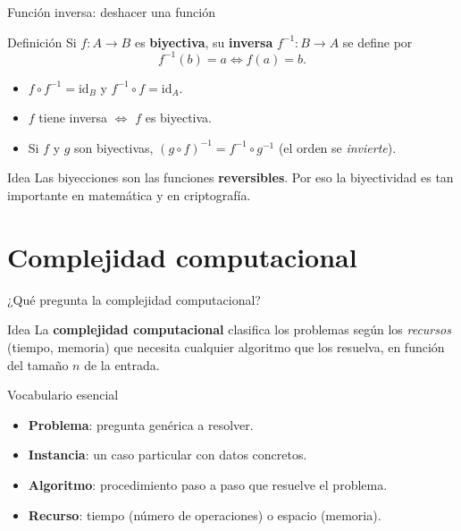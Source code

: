 \documentclass[10pt,xcolor=dvipsnames]{beamer}
\begin{document}
\begin{frame}{Función inversa: deshacer una función}
  \begin{block}{Definición}
    Si $f : A \to B$ es \textbf{biyectiva}, su \textbf{inversa}
    $f^{-1} : B \to A$ se define por
    \[
      f^{-1}(b) = a \iff f(a) = b.
    \]
  \end{block}

  \begin{itemize}
    \item $f \circ f^{-1} = \mathrm{id}_B$ y $f^{-1} \circ f = \mathrm{id}_A$.
    \item $f$ tiene inversa $\iff$ $f$ es biyectiva.
    \item Si $f$ y $g$ son biyectivas, $(g \circ f)^{-1} = f^{-1} \circ g^{-1}$
          (el orden se \emph{invierte}).
  \end{itemize}

  \begin{alertblock}{Idea}
    Las biyecciones son las funciones \textbf{reversibles}. Por eso la
    biyectividad es tan importante en matemática y en criptografía.
  \end{alertblock}
\end{frame}





\section{Complejidad computacional}

\begin{frame}{¿Qué pregunta la complejidad computacional?}
  \begin{block}{Idea}
    La \textbf{complejidad computacional} clasifica los problemas según
    los \emph{recursos} (tiempo, memoria) que necesita cualquier algoritmo
    que los resuelva, en función del tamaño $n$ de la entrada.
  \end{block}

  \begin{block}{Vocabulario esencial}
    \begin{itemize}
      \item \textbf{Problema}: pregunta genérica a resolver.
      \item \textbf{Instancia}: un caso particular con datos concretos.
      \item \textbf{Algoritmo}: procedimiento paso a paso que resuelve
            el problema.
      \item \textbf{Recurso}: tiempo (número de operaciones) o espacio
            (memoria).
    \end{itemize}
  \end{block}
\end{frame}
\end{document}
